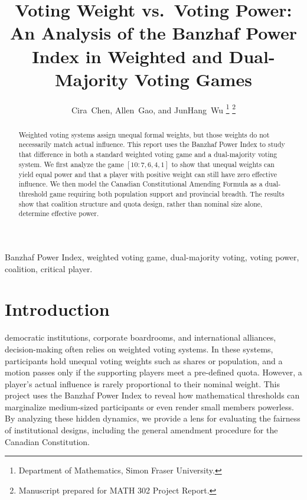 \documentclass[lettersize,journal]{IEEEtran}
\begin{document}
\title{Voting Weight vs.\ Voting Power:\\
An Analysis of the Banzhaf Power Index in Weighted and Dual-Majority Voting Games}

\author{Cira~Chen, Allen~Gao, and JunHang~Wu%
\thanks{Department of Mathematics, Simon Fraser University.}%
\thanks{Manuscript prepared for MATH 302 Project Report.}}


\maketitle

\begin{abstract}
Weighted voting systems assign unequal formal weights, but those weights do not necessarily match actual influence. This report uses the Banzhaf Power Index to study that difference in both a standard weighted voting game and a dual-majority voting system. We first analyze the game $[10:7,6,4,1]$ to show that unequal weights can yield equal power and that a player with positive weight can still have zero effective influence. We then model the Canadian Constitutional Amending Formula as a dual-threshold game requiring both population support and provincial breadth. The results show that coalition structure and quota design, rather than nominal size alone, determine effective power.
\end{abstract}

\begin{IEEEkeywords}
Banzhaf Power Index, weighted voting game, dual-majority voting, voting power, coalition, critical player.
\end{IEEEkeywords}

\section{Introduction}
 democratic institutions, corporate boardrooms, and international alliances, decision-making often relies on weighted voting systems. In these systems, participants hold unequal voting weights such as shares or population, and a motion passes only if the supporting players meet a pre-defined quota. However, a player's actual influence is rarely proportional to their nominal weight. This project uses the Banzhaf Power Index to reveal how mathematical thresholds can marginalize medium-sized participants or even render small members powerless. By analyzing these hidden dynamics, we provide a lens for evaluating the fairness of institutional designs, including the general amendment procedure for the Canadian Constitution.
\end{document}
